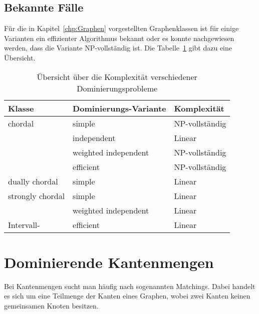 \subsection{Bekannte Fälle}
Für die in Kapitel~\ref{chp:Graphen} vorgestellten Graphenklassen ist für einige Varianten ein effizienter Algorithmus bekannt oder es konnte nachgewiesen werden, dass die Variante NP-vollständig ist. Die Tabelle~\ref{tbl:domination} gibt dazu eine Übersicht.
\begin{table}[htbp]
    \centering
    \setlength\tabcolsep{.75em}
    \setlength\arrayrulewidth{1pt}
    \begin{tabularx}{\linewidth}{@{}lXl@{}}
        \midrule[1pt]
        \bfseries\rmfamily\textcolor{clSecTxt}{Klasse} & \bfseries\rmfamily\textcolor{clSecTxt}{Dominierungs-Variante} & \bfseries\rmfamily\textcolor{clSecTxt}{Komplexität}  \\
        \midrule[1pt]
        chordal & simple & NP-vollständig \cite{booth1982} \\
         & independent & Linear \cite{Faber1982} \\
         & weighted independent & NP-vollständig \cite{GerardJ2004} \\
         & efficient & NP-vollständig \cite{ChainChin1996} \\
        \midrule[.4pt]
        dually chordal & simple & Linear \cite{Brandstaedt199843} \\
        \midrule[.4pt]
        strongly chordal\footnotemark & simple & Linear \cite{Faber1984} \\
         & weighted independent & Linear \cite{Faber1984} \\
         \midrule[.4pt]
         Intervall- & efficient & Linear \cite{wipdIntervall} \\
        \midrule[1pt]
    \end{tabularx}
    \caption{Übersicht über die Komplexität verschiedener Dominierungsprobleme}
    \label{tbl:domination}
\end{table}


\section{Dominierende Kantenmengen}

Bei Kantenmengen sucht man häufig nach sogenannten Matchings. Dabei handelt es sich um eine Teilmenge der Kanten eines Graphen, wobei zwei Kanten keinen gemeinsamen Knoten besitzen.

